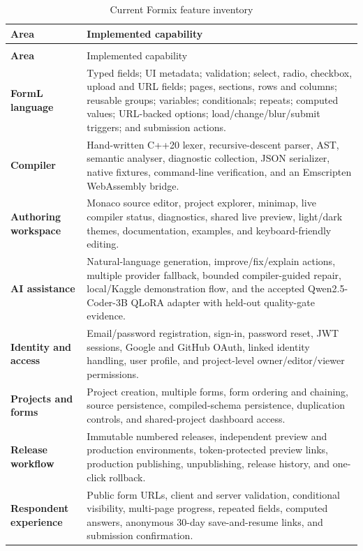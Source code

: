 \documentclass[12pt,a4paper,oneside]{report}
\begin{document}
\begin{longtable}{>{\bfseries}p{}p{}}
\caption{Current Formix feature inventory}\label{tab:feature-inventory}\\
\toprule
Area & Implemented capability\\
\midrule
\endfirsthead
\multicolumn{2}{l}{\small\itshape Table~\thetable\ continued from the previous page}\\
\toprule
Area & Implemented capability\\
\midrule
\endhead
\bottomrule
\endfoot
FormL language & Typed fields; UI metadata; validation; select, radio, checkbox, upload and URL fields; pages, sections, rows and columns; reusable groups; variables; conditionals; repeats; computed values; URL-backed options; load/change/blur/submit triggers; and submission actions.\\
Compiler & Hand-written C++20 lexer, recursive-descent parser, AST, semantic analyser, diagnostic collection, JSON serializer, native fixtures, command-line verification, and an Emscripten WebAssembly bridge.\\
Authoring workspace & Monaco source editor, project explorer, minimap, live compiler status, diagnostics, shared live preview, light/dark themes, documentation, examples, and keyboard-friendly editing.\\
AI assistance & Natural-language generation, improve/fix/explain actions, multiple provider fallback, bounded compiler-guided repair, local/Kaggle demonstration flow, and the accepted Qwen2.5-Coder-3B QLoRA adapter with held-out quality-gate evidence.\\
Identity and access & Email/password registration, sign-in, password reset, JWT sessions, Google and GitHub OAuth, linked identity handling, user profile, and project-level owner/editor/viewer permissions.\\
Projects and forms & Project creation, multiple forms, form ordering and chaining, source persistence, compiled-schema persistence, duplication controls, and shared-project dashboard access.\\
Release workflow & Immutable numbered releases, independent preview and production environments, token-protected preview links, production publishing, unpublishing, release history, and one-click rollback.\\
Respondent experience & Public form URLs, client and server validation, conditional visibility, multi-page progress, repeated fields, computed answers, anonymous 30-day save-and-resume links, and submission confirmation.\\

\end{longtable}
\end{document}
